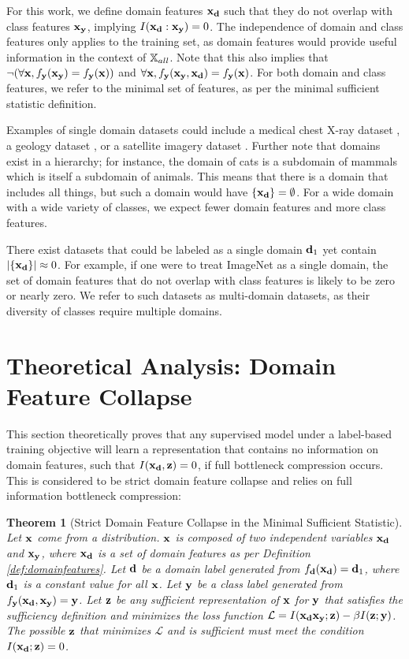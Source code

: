 \documentclass[11pt, oneside]{book}
\theoremstyle{plain}
\newtheorem{theorem}{Theorem}[section]
\theoremstyle{definition}
\theoremstyle{remark}
\begin{document}
For this work, we define domain features ${\mathbf{x}}_{\mathbf{d}}$ such that they do not overlap with class features ${\mathbf{x}}_{\mathbf{y}}$, implying $I({\mathbf{x}}_{\mathbf{d}}:{\mathbf{x}}_{\mathbf{y}}) = 0$. The independence of domain and class features only applies to the training set, as domain features would provide useful information in the context of ${\mathbb{X}}_{all}$. Note that this also implies that $\neg(\forall{\mathbf{x}},  f_{\mathbf{y}}({\mathbf{x}}_{\mathbf{y}}) = f_{\mathbf{y}}({\mathbf{x}}))$ and $\forall{\mathbf{x}}, f_{\mathbf{y}}({\mathbf{x}}_{\mathbf{y}}, {\mathbf{x}}_{\mathbf{d}}) = f_{\mathbf{y}}({\mathbf{x}})$. For both domain and class features, we refer to the minimal set of features, as per the minimal sufficient statistic definition.

Examples of single domain datasets could include a medical chest X-ray dataset \citep{yang2023medmnist}, a geology dataset \citep{rock_data}, or a satellite imagery dataset \citep{helber2019eurosat}. Further note that domains exist in a hierarchy; for instance, the domain of cats is a subdomain of mammals which is itself a subdomain of animals. This means that there is a domain that includes all things, but such a domain would have $\{{\mathbf{x}}_{\mathbf{d}}\} = \emptyset$. For a wide domain with a wide variety of classes, we expect fewer domain features and more class features.

There exist datasets that could be labeled as a single domain ${\mathbf{d}}_1$ yet contain $|\{{\mathbf{x}}_{\mathbf{d}}\}| \approx 0$. For example, if one were to treat ImageNet as a single domain, the set of domain features that do not overlap with class features is likely to be zero or nearly zero. We refer to such datasets as multi-domain datasets, as their diversity of classes require multiple domains.

\section{Theoretical Analysis: Domain Feature Collapse}

This section theoretically proves that any supervised model under a label-based training objective will learn a representation that contains no information on domain features, such that $I({\mathbf{x}}_{\mathbf{d}}, {\mathbf{z}}) = 0$, if full bottleneck compression occurs. This is considered to be strict domain feature collapse and relies on full information bottleneck compression:

\begin{theorem}[Strict Domain Feature Collapse in the Minimal Sufficient Statistic]
Let ${\mathbf{x}}$ come from a distribution. ${\mathbf{x}}$ is composed of two independent variables ${\mathbf{x}}_{\mathbf{d}}$ and ${\mathbf{x}}_{\mathbf{y}}$, where ${\mathbf{x}}_{\mathbf{d}}$ is a set of domain features as per Definition \ref{def:domainfeatures}. Let ${\mathbf{d}}$ be a domain label generated from $f_{\mathbf{d}}({\mathbf{x}}_{\mathbf{d}}) = {\mathbf{d}}_1$, where ${\mathbf{d}}_1$ is a constant value for all ${\mathbf{x}}$. Let ${\mathbf{y}}$ be a class label generated from $f_{\mathbf{y}}({\mathbf{x}}_{\mathbf{d}}, {\mathbf{x}}_{\mathbf{y}}) = {\mathbf{y}}$. Let ${\mathbf{z}}$ be any sufficient representation of ${\mathbf{x}}$ for ${\mathbf{y}}$ that satisfies the sufficiency definition and minimizes the loss function $\mathcal{L} = I({\mathbf{x}}_{\mathbf{d}} {\mathbf{x}}_{\mathbf{y}}; {\mathbf{z}}) - \beta I({\mathbf{z}};{\mathbf{y}})$. The possible ${\mathbf{z}}$ that minimizes $\mathcal{L}$ and is sufficient must meet the condition $I({\mathbf{x}}_{\mathbf{d}}; {\mathbf{z}}) = 0$.
\label{thm:domainfeaturecollapse}
\end{theorem}
\end{document}
